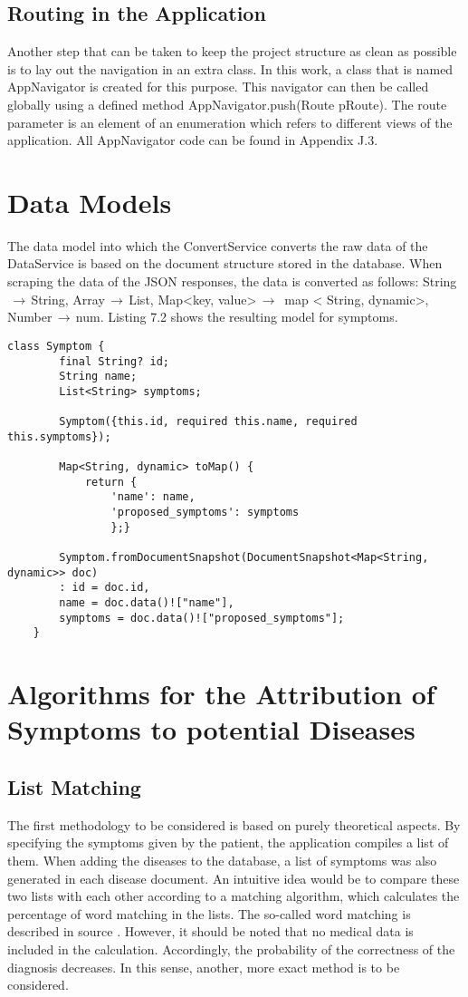 \subsection{Routing in the Application}
Another step that can be taken to keep the project structure as clean as possible is to lay out the navigation in an extra class. In this work, a class that is named AppNavigator is created for this purpose. This navigator can then be called globally using a defined method AppNavigator.push(Route pRoute). The route parameter is an element of an enumeration which refers to different views of the application. All AppNavigator code can be found in Appendix J.3.
\section{Data Models}
The data model into which the ConvertService converts the raw data of the DataService is based on the document structure stored in the database. When scraping the data of the JSON responses, the data is converted as follows: String$\,\to\,$String, Array$\,\to\,$List, Map<key, value>$\,\to\,$ map < String, dynamic>, Number$\,\to\,$num. Listing 7.2 shows the resulting model for symptoms.
\scriptsize
\begin{lstlisting}[caption=Model for Symptoms]
	class Symptom {
		final String? id;
		String name;
		List<String> symptoms;
		
		Symptom({this.id, required this.name, required this.symptoms});
		
		Map<String, dynamic> toMap() {
			return {
				'name': name,
				'proposed_symptoms': symptoms
				};}
		
		Symptom.fromDocumentSnapshot(DocumentSnapshot<Map<String, dynamic>> doc)
		: id = doc.id,
		name = doc.data()!["name"],
		symptoms = doc.data()!["proposed_symptoms"];	
	}
\end{lstlisting}
\normalsize


\section{Algorithms for the Attribution of Symptoms to potential Diseases}
\subsection{List Matching}
The first methodology to be considered is based on purely theoretical aspects. By specifying the symptoms given by the patient, the application compiles a list of them. When adding the diseases to the database, a list of symptoms was also generated in each disease document. An intuitive idea would be to compare these two lists with each other according to a matching algorithm, which calculates the percentage of word matching in the lists. The so-called word matching is described in source \cite{.wordmatching}. However, it should be noted that no medical data is included in the calculation. Accordingly, the probability of the correctness of the diagnosis decreases. In this sense, another, more exact method is to be considered.

